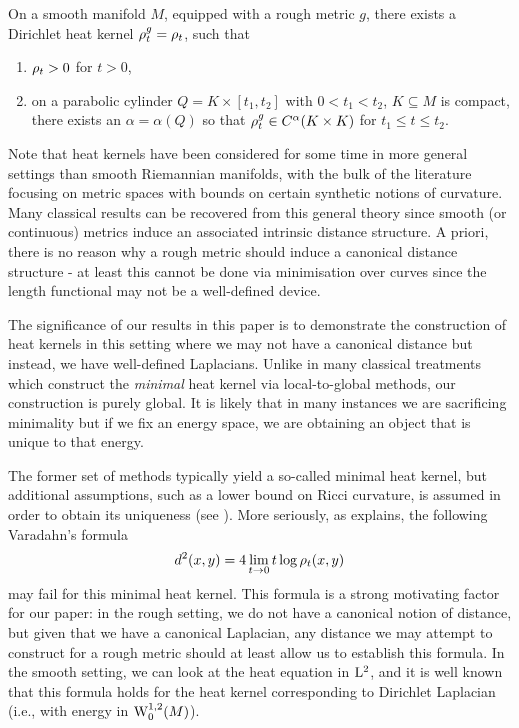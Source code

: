 \documentclass[a4paper, 12pt]{amsart}
\begin{document}
\begin{thm}
On a smooth manifold \(M\), equipped with a rough metric \(g\), there exists a 
Dirichlet heat kernel \(\hk_t^g = \hk_t\), such that
\begin{enumerate}
\item \(\hk_t > 0\) for \(t > 0\),
\item on a parabolic cylinder \(Q = K \times [t_1, t_2]\) with \(0 < t_1 < t_2\), \(K \subseteq M\) is compact, there exists an \(\alpha = \alpha(Q)\) so that \(\hk_t^g \in C^{\alpha}(K \times K)\) for \(t_1 \leq t \leq t_2\).
\end{enumerate}
\end{thm}


Note that heat kernels have been considered
for some time in more general settings than smooth Riemannian manifolds,
with the bulk of the literature focusing on metric spaces with bounds
on certain synthetic notions of curvature.
Many classical results can be recovered from this general 
theory since smooth (or continuous) metrics induce an associated intrinsic
distance structure. A priori, there is no reason
why a rough metric should induce a canonical distance structure - at least
this cannot be done via minimisation over curves since the
length functional may not be a well-defined device. 

The significance of our results in this paper is to demonstrate
the construction of heat kernels in this setting where we may 
not have a canonical distance but instead, we have well-defined Laplacians. 
Unlike in many classical treatments which construct the \emph{minimal} 
heat kernel via local-to-global methods, our construction is purely global.
It is likely that in many instances we are sacrificing minimality but if we fix
an energy space, we are obtaining an object that is unique to that energy.

The former set of methods typically yield a so-called minimal heat kernel,
but additional assumptions, such as a lower bound on Ricci curvature,
is assumed in order to obtain its uniqueness (see \cite{Chavel}).
More seriously, as \cite{??} explains, the following Varadahn's formula
$$ d^2(x,y) = 4 \lim_{t \to 0} t \log \hk_t(x,y)$$
may fail for this minimal heat kernel. 
This formula is a strong motivating factor for our paper: 
in the rough setting, we do not have a canonical notion of
distance, but given that we have a canonical Laplacian, 
any distance we may attempt to construct for a rough 
metric should at least allow us to establish this formula.
In the smooth setting, we can look at the heat equation
in $\Lp{2}$, and it is well known that
this formula holds for the heat kernel corresponding to Dirichlet Laplacian (i.e., 
with energy in $\SobH[0]{1}(M)$). 
\end{document}
